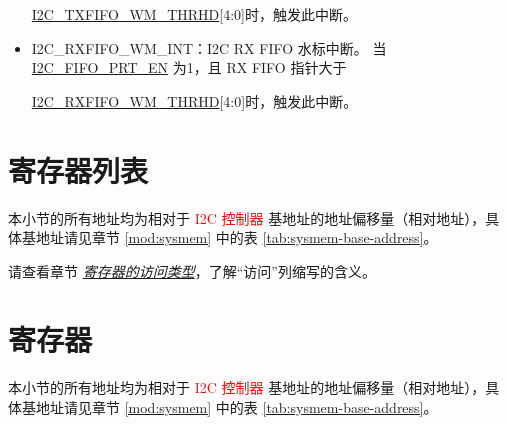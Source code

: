 \documentclass[main\_\_CN.tex]{subfiles}
\begin{document}
\begin{itemize}
\hyperref[fielddesc:I2CTXFIFOWMTHRHD]{I2C\_TXFIFO\_WM\_THRHD}[4:0]时，触发此中断。
\item \label{int:i2c-rxfifo-wm}I2C\_RXFIFO\_WM\_INT：I2C RX FIFO 水标中断。 当\hyperref[fielddesc:I2CFIFOPRTEN]{I2C\_FIFO\_PRT\_EN} 为1，且 RX FIFO 指针大于

\hyperref[fielddesc:I2CRXFIFOWMTHRHD]{I2C\_RXFIFO\_WM\_THRHD}[4:0]时，触发此中断。
\end{itemize}



\clearpage
\section{寄存器列表}
\label{sec:i2c-reg-summ}
\hypertarget{i2c-reg-summ}{}

本小节的所有地址均为相对于 \textcolor{red}{I2C 控制器} 基地址的地址偏移量（相对地址），具体基地址请见章节 \ref{mod:sysmem} \textit{} 中的表 \ref{tab:sysmem-base-address}。

请查看章节 \hyperref[glossary-access-types]{\textit{寄存器的访问类型}}，了解“访问”列缩写的含义。





\clearpage
\section{寄存器}

本小节的所有地址均为相对于 \textcolor{red}{I2C 控制器} 基地址的地址偏移量（相对地址），具体基地址请见章节 \ref{mod:sysmem} \textit{} 中的表 \ref{tab:sysmem-base-address}。


\end{document}
